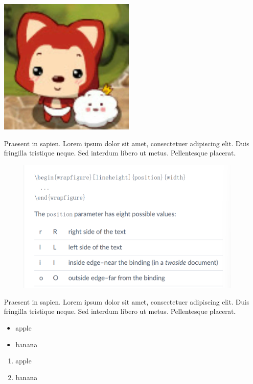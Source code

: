\documentclass[12pt, a4paper]{article}
\begin{document}
\includegraphics[scale=0.2, angle=45]{favicon.png}

Praesent in sapien. Lorem ipsum dolor sit amet, consectetuer
adipiscing elit. Duis fringilla tristique neque. Sed interdum
libero ut metus. Pellentesque placerat.

\begin{figure} %
    \centering
    \includegraphics[width=\linewidth]{wrap_figure.png}
\end{figure}

Praesent in sapien. Lorem ipsum dolor sit amet, consectetuer
adipiscing elit. Duis fringilla tristique neque. Sed interdum
libero ut metus. Pellentesque placerat.


\begin{itemize}
    \item apple
    \item banana
\end{itemize}

\begin{enumerate}
    \item apple
    \item banana
\end{enumerate}
\end{document}
